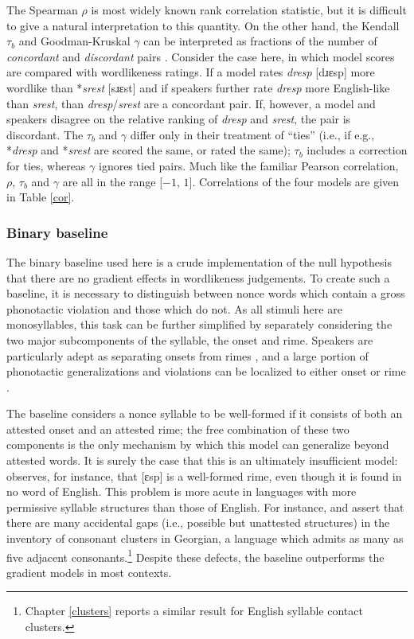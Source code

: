 The Spearman $\rho$ is most widely known rank correlation statistic, but it is difficult to give a natural interpretation to this quantity. On the other hand, the Kendall $\tau_b$ and Goodman-Kruskal $\gamma$ can be interpreted as fractions of the number of \emph{concordant} and \emph{discordant} pairs \citep{Noether1981}. Consider the case here, in which model scores are compared with wordlikeness ratings. If a model rates \emph{dresp} [dɹɛsp] more wordlike than *\emph{srest} [sɹɛst] and if speakers further rate \emph{dresp} more English-like than \emph{srest}, than \emph{dresp}/\emph{srest} are a concordant pair. If, however, a model and speakers disagree on the relative ranking of \emph{dresp} and \emph{srest}, the pair is discordant. The $\tau_b$ and $\gamma$ differ only in their treatment of ``ties'' (i.e., if e.g., *\emph{dresp} and *\emph{srest} are scored the same, or rated the same); $\tau_b$ includes a correction for ties, whereas $\gamma$ ignores tied pairs. Much like the familiar Pearson correlation, $\rho$, $\tau_b$ and $\gamma$ are all in the range [$-1$, $1$]. Correlations of the four models are given in Table \ref{cor}.

\subsubsection{Binary baseline}

The binary baseline used here is a crude implementation of the null hypothesis that there are no gradient effects in wordlikeness judgements. To create such a baseline, it is necessary to distinguish between nonce words which contain a gross phonotactic violation and those which do not. As all stimuli here are monosyllables, this task can be further simplified by separately considering the two major subcomponents of the syllable, the onset and rime. Speakers are particularly adept as separating onsets from rimes \citep{Treiman1986,Treiman1995,Fowler1993}, and a large portion of phonotactic generalizations and violations can be localized to either onset or rime \citep[e.g.,][]{Borowsky1989,Fudge1969,Treiman1995,Kessler1997,Treiman2000}.

The baseline considers a nonce syllable to be well-formed if it consists of both an attested onset and an attested rime; the free combination of these two components is the only mechanism by which this model can generalize beyond attested words. It is surely the case that this is an ultimately insufficient model: \citet{Albright2009a} observes, for instance, that [ɛsp] is a well-formed rime, even though it is found in no word of English. This problem is more acute in languages with more permissive syllable structures than those of English. For instance, \citet{Fischer-Jorgensen1952} and \citet{Vogt1954} assert that there are many accidental gaps (i.e., possible but unattested structures) in the inventory of consonant clusters in Georgian, a language which admits as many as five adjacent consonants.\footnote{
Chapter \ref{clusters} 
reports a similar result for English syllable contact clusters.} Despite these defects, the baseline outperforms the gradient models in most contexts.

